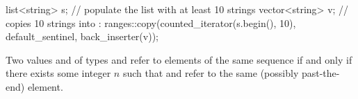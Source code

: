 \pnum
\begin{example}
\begin{codeblock}
list<string> s;
// populate the list  with at least 10 strings
vector<string> v;
// copies 10 strings into :
ranges::copy(counted_iterator(s.begin(), 10), default_sentinel, back_inserter(v));
\end{codeblock}
\end{example}

\pnum
Two values  and  of types
and
refer to elements of the same sequence if and only if
there exists some integer $n$ such that
and
refer to the same (possibly past-the-end) element.

